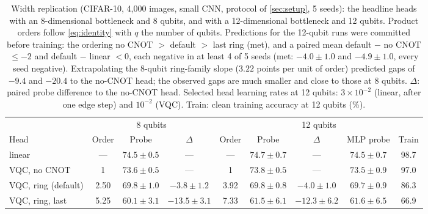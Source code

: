 \begin{table}[t]
\centering
\caption{Width replication (CIFAR-10, 4,000 images, small CNN, protocol of \cref{sec:setup}, 5 seeds): the
headline heads with an 8-dimensional bottleneck and 8 qubits, and with a 12-dimensional bottleneck and
12 qubits. Product orders follow \cref{eq:identity} with $q$ the number of qubits. Predictions for the 12-qubit runs were
committed before training: the ordering no CNOT $>$ default $>$ last ring (met), and a paired mean
default $-$ no CNOT $\le-2$ and default $-$ linear $<0$, each negative in at least 4 of 5 seeds (met:
$-4.0\pm1.0$ and $-4.9 \pm 1.0$, every seed negative).
Extrapolating the 8-qubit ring-family slope ($3.22$ points per unit of order) predicted gaps of
$-9.4$ and $-20.4$ to the no-CNOT head; the observed gaps are much smaller and close to
those at 8 qubits. $\Delta$: paired probe difference to the no-CNOT head. Selected head learning rates at
12 qubits: $3\times10^{-2}$ (linear, after one edge step) and $10^{-2}$ (VQC). Train: clean training accuracy at 12 qubits (\%).}
\label{tab:width}
\small
\begin{tabular}{lcccccccc}
\toprule
& \multicolumn{3}{c}{8 qubits} & \multicolumn{5}{c}{12 qubits} \\
\cmidrule(lr){2-4}\cmidrule(lr){5-9}
Head & Order & Probe & $\Delta$ & Order & Probe & $\Delta$ & MLP probe & Train \\
\midrule
linear & --- & $74.5 \pm 0.5$ & --- & --- & $74.7 \pm 0.7$ & --- & $74.5 \pm 0.7$ & 98.7 \\
VQC, no CNOT & 1 & $73.6 \pm 0.5$ & --- & 1 & $73.8 \pm 0.5$ & --- & $73.5 \pm 0.9$ & 97.0 \\
VQC, ring (default) & 2.50 & $69.8 \pm 1.0$ & $-3.8 \pm 1.2$ & 3.92 & $69.8 \pm 0.8$ & $-4.0 \pm 1.0$ & $69.7 \pm 0.9$ & 86.3 \\
VQC, ring, last & 5.25 & $60.1 \pm 3.1$ & $-13.5 \pm 3.1$ & 7.33 & $61.5 \pm 6.1$ & $-12.3 \pm 6.2$ & $61.6 \pm 6.5$ & 66.9 \\
\bottomrule
\end{tabular}
\end{table}

